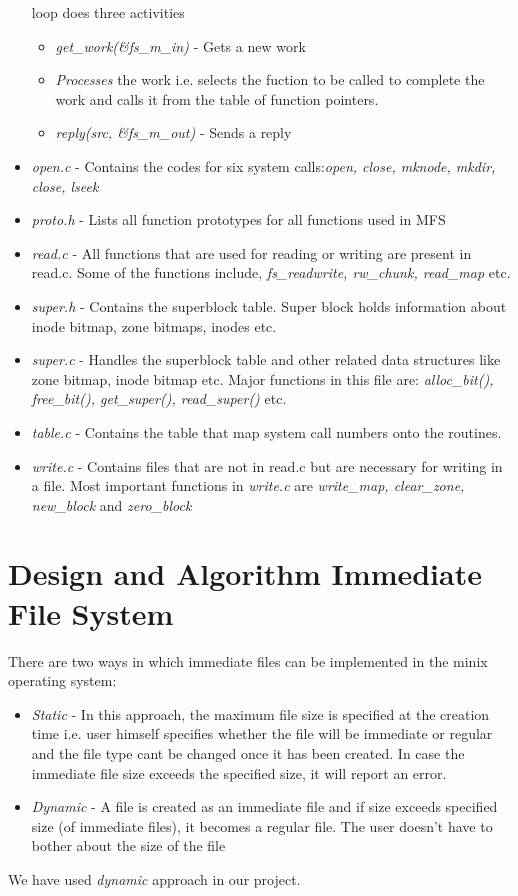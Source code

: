 \begin{itemize}
loop does three activities
	\begin{itemize} 
        \item \emph{get\_work(\&fs\_m\_in)} - Gets a new work 
        \item \emph{Processes} the work i.e. selects the fuction to be called
        to complete the work and calls it from the table of function pointers. 
        \item \emph{reply(src, \&fs\_m\_out)} - Sends a reply
     \end{itemize}
\item \emph{open.c} - Contains the codes for six system calls:\emph{open, close,
mknode, mkdir, close, lseek}
\item \emph{proto.h} - Lists all function prototypes for all functions used in
MFS
\item \emph{read.c} - All functions that are used for reading or writing are
present in read.c. Some of the functions include, \emph{fs\_readwrite,
rw\_chunk, read\_map} etc.
\item \emph{super.h} - Contains the superblock table. Super block holds
information about inode bitmap, zone bitmaps, inodes etc.
\item \emph{super.c} - Handles the superblock table and other related data
structures like zone bitmap, inode bitmap etc. Major functions in this file are:
\emph{alloc\_bit(), free\_bit(), get\_super(), read\_super()} etc.
\item \emph{table.c} - Contains the table that map system call numbers
onto the routines. 
\item \emph{write.c} - Contains files that are not in read.c but are necessary
for writing in a file. Most important functions in \emph{write.c} are
\emph{write\_map, clear\_zone, new\_block} and \emph{zero\_block}
 
\end{itemize}

\newpage
\section{Design and Algorithm Immediate File System}
There are two ways in which immediate files can be implemented in the
minix operating system:
\begin{itemize}

\item \emph{Static} - In this approach, the maximum file size is specified at
the creation time i.e. user himself specifies whether the file will be immediate
or regular and the file type cant be changed once it has been created. 
In case the immediate file size exceeds the specified size, it will report an error.
\item \emph{Dynamic} - A file is created as an immediate file and if size
exceeds specified size (of immediate files), it becomes a regular file. The user
doesn’t have to bother about the size of the file
\end{itemize}
We have used \emph{dynamic} approach in our project.


